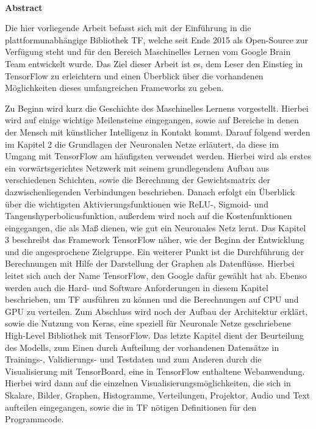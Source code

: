 

\newpage{}

~

\vspace{17.1mm}


\noindent \begin{flushleft}
\textbf{\huge{}Abstract}
\par\end{flushleft}{\huge \par}

Die hier vorliegende Arbeit befasst sich mit der Einführung in die plattformunabhängige Bibliothek \gls{TF}, welche seit Ende 2015 als Open-Source zur Verfügung steht und für den Bereich Maschinelles Lernen vom Google Brain Team entwickelt wurde. Das Ziel dieser Arbeit ist es, dem Leser den Einstieg in TensorFlow zu erleichtern und einen Überblick über die vorhandenen Möglichkeiten dieses umfangreichen Frameworks zu geben.

Zu Beginn wird kurz die Geschichte des Maschinelles Lernens vorgestellt. Hierbei wird auf einige wichtige Meilensteine eingegangen, sowie auf Bereiche in denen der Mensch mit künstlicher Intelligenz in Kontakt kommt. Darauf folgend werden im Kapitel 2  die Grundlagen der Neuronalen Netze erläutert, da diese im Umgang mit TensorFlow am häufigsten verwendet werden. Hierbei wird als erstes ein vorwärtsgerichtes Netzwerk mit seinem grundlegendem Aufbau aus verschiedenen Schichten, sowie die Berechnung der Gewichtsmatrix der dazwischenliegenden Verbindungen beschrieben. Danach erfolgt ein Überblick über die wichtigsten  Aktivierungsfunktionen wie ReLU-, Sigmoid- und Tangenshyperbolicusfunktion, außerdem wird noch auf die Kostenfunktionen eingegangen, die als Maß dienen, wie gut ein Neuronales Netz lernt. Das Kapitel 3 beschreibt das Framework TensorFlow näher, wie der Beginn der Entwicklung und die angesprochene Zielgruppe. Ein weiterer Punkt ist die Durchführung der Berechnungen mit Hilfe der Darstellung der Graphen als Datenflüsse. Hierbei leitet sich auch der Name TensorFlow, den Google dafür gewählt hat ab. Ebenso werden auch die Hard- und Software Anforderungen in diesem Kapitel beschrieben, um TF ausführen zu können und die Berechnungen auf CPU und GPU zu verteilen. Zum Abschluss wird noch der Aufbau der Architektur erklärt, sowie die Nutzung von Keras, eine speziell für Neuronale Netze geschriebene High-Level Bibliothek mit TensorFlow. Das letzte Kapitel dient der Beurteilung des Modells, zum Einen durch Aufteilung der vorhandenen Datensätze in Trainings-, Validierungs- und Testdaten und zum Anderen durch die Visualisierung mit TensorBoard, eine in TensorFlow enthaltene Webanwendung. Hierbei wird dann auf die einzelnen Visualisierungsmöglichkeiten, die sich in Skalare, Bilder, Graphen, Histogramme, Verteilungen, Projektor, Audio und Text aufteilen eingegangen, sowie die in TF nötigen Definitionen für den Programmcode.  
